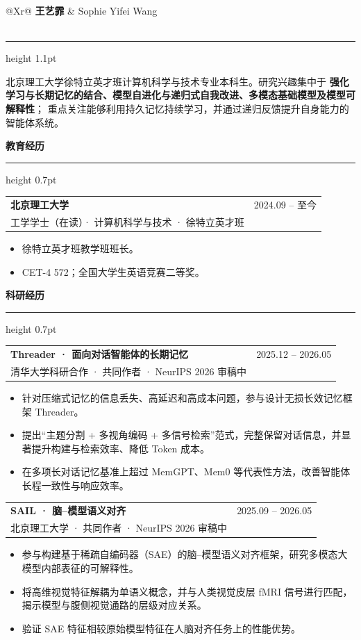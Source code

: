 \documentclass[10pt,a4paper]{article}
\makeatletter
\newcommand{\cvsection}[1]{%
  \vspace{0.72em}
  {\large\bfseries\color{Ink} #1}\par
  \vspace{0.22em}
  {\color{Rule}\hrule height 0.7pt}
  \vspace{0.36em}
}
\newcommand{\entryheading}[3]{%
  \begin{tabularx}{\textwidth}{@{}Xr@{}}
    {\bfseries\color{Ink} #1} & {\small\color{Muted} #3} \\
    {\small\color{Accent} #2} &
  \end{tabularx}
  \vspace{-0.28em}
}
\makeatother
\begin{document}
\color{Ink}
\sffamily

\begin{tabularx}{\textwidth}{@{}Xr@{}}
  {\fontsize{23}{27}\selectfont\bfseries 王艺霏} &
  {\fontsize{15}{18}\selectfont\color{Muted} Sophie Yifei Wang} \\
   \\
\end{tabularx}

\vspace{0.55em}
{\color{Rule}\hrule height 1.1pt}
\vspace{0.52em}

\justifying
北京理工大学徐特立英才班计算机科学与技术专业本科生。研究兴趣集中于
\textbf{强化学习与长期记忆的结合、模型自进化与递归式自我改进、多模态基础模型及模型可解释性}；
重点关注能够利用持久记忆持续学习，并通过递归反馈提升自身能力的智能体系统。

\cvsection{教育经历}

\entryheading{北京理工大学}{工学学士（在读）· 计算机科学与技术 · 徐特立英才班}{2024.09 -- 至今}
\begin{itemize}
  \item 徐特立英才班教学班班长。
  \item CET-4 572；全国大学生英语竞赛二等奖。
\end{itemize}

\cvsection{科研经历}

\entryheading{Threader · 面向对话智能体的长期记忆}{清华大学科研合作 · 共同作者 · NeurIPS 2026 审稿中}{2025.12 -- 2026.05}
\begin{itemize}
  \item 针对压缩式记忆的信息丢失、高延迟和高成本问题，参与设计无损长效记忆框架 Threader。
  \item 提出“主题分割 + 多视角编码 + 多信号检索”范式，完整保留对话信息，并显著提升构建与检索效率、降低 Token 成本。
  \item 在多项长对话记忆基准上超过 MemGPT、Mem0 等代表性方法，改善智能体长程一致性与响应效率。
\end{itemize}

\vspace{0.25em}
\entryheading{SAIL · 脑--模型语义对齐}{北京理工大学 · 共同作者 · NeurIPS 2026 审稿中}{2025.09 -- 2026.05}
\begin{itemize}
  \item 参与构建基于稀疏自编码器（SAE）的脑--模型语义对齐框架，研究多模态大模型内部表征的可解释性。
  \item 将高维视觉特征解耦为单语义概念，并与人类视觉皮层 fMRI 信号进行匹配，揭示模型与腹侧视觉通路的层级对应关系。
  \item 验证 SAE 特征相较原始模型特征在人脑对齐任务上的性能优势。
\end{itemize}
\end{document}
